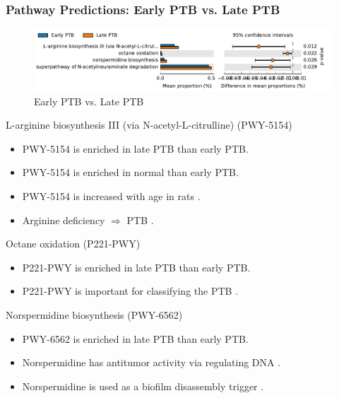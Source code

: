 \documentclass{beamer}
\begin{document}
    \begin{frame}[allowframebreaks]
        \frametitle{Pathway Predictions: Early PTB vs. Late PTB}

        \begin{figure}
            \includegraphics[width=0.9 \linewidth]{figures/PICRUSt2/EL.pdf}
            \caption{Early PTB vs. Late PTB}
        \end{figure}

        \begin{block}{L-arginine biosynthesis III (via N-acetyl-L-citrulline) (PWY-5154)}
            \begin{itemize}
                \item PWY-5154 is enriched in late PTB than early PTB.
                \item PWY-5154 is enriched in normal than early PTB.
                \item PWY-5154 is increased with age in rats \cite{PWY-5154-1}.
                \item Arginine deficiency $\Rightarrow$ PTB \cite{PWY-5154-3, PWY-5154-4, PWY-5154-2}.
            \end{itemize}
        \end{block}

        \begin{block}{Octane oxidation (P221-PWY)}
            \begin{itemize}
                \item P221-PWY is enriched in late PTB than early PTB.
                \item P221-PWY is important for classifying the PTB \cite{P221-PWY-1}.
            \end{itemize}
        \end{block}

        \begin{block}{Norspermidine biosynthesis (PWY-6562)}
            \begin{itemize}
                \item PWY-6562 is enriched in late PTB than early PTB.
                \item Norspermidine has antitumor activity via regulating DNA \cite{PWY-6562-1}.
                \item Norspermidine is used as a biofilm disassembly trigger \cite{PWY-6562-2}.
            \end{itemize}
        \end{block}


\end{frame}
\end{document}
